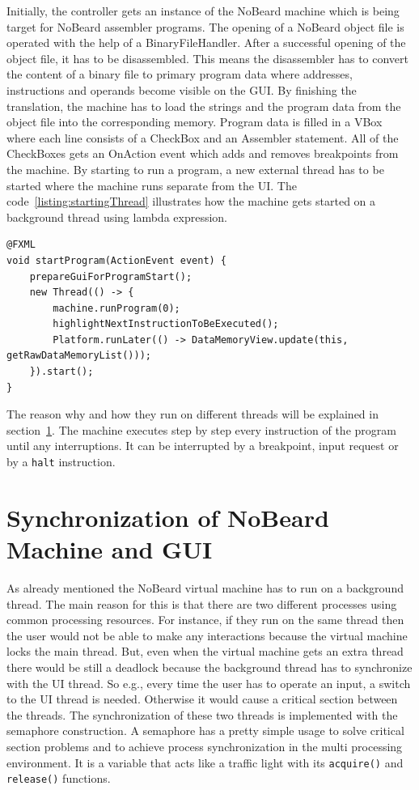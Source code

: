 Initially, the controller gets an instance of the NoBeard machine which is being target for NoBeard assembler programs. The opening of a NoBeard object file is operated with the help of a BinaryFileHandler. After a successful opening of the object file, it has to be disassembled. This means the disassembler has to convert the content of a binary file to primary program data where addresses, instructions and operands become visible on the GUI.
By finishing the translation, the machine has to load the strings and the program data from the object file into the corresponding memory. Program data is filled in a VBox where each line consists of a CheckBox and an Assembler statement. All of the CheckBoxes gets an OnAction event which adds and removes breakpoints from the machine. 
By starting to run a program, a new external thread has to be started where the machine runs separate from the UI. The code~\ref{listing:startingThread} illustrates how the machine gets started on a background thread using lambda expression.
\begin{lstlisting}[caption={Starting the machine on a new thread},label=listing:startingThread]
@FXML
void startProgram(ActionEvent event) {
    prepareGuiForProgramStart();
    new Thread(() -> {
        machine.runProgram(0);
        highlightNextInstructionToBeExecuted();
        Platform.runLater(() -> DataMemoryView.update(this, getRawDataMemoryList()));
    }).start();
}
\end{lstlisting}
The reason why and how they run on different threads will be explained in section~\ref{sec:synchronization}. The machine executes step by step every instruction of the program until any interruptions. It can be interrupted by a breakpoint, input request or by a \lstinline$halt$ instruction. 
\section{Synchronization of NoBeard Machine and GUI}
\label{sec:synchronization} 
As already mentioned the NoBeard virtual machine has to run on a background thread. The main reason for this is that there are two different processes using common processing resources. For instance, if they run on the same thread then the user would not be able to make any interactions because the virtual machine locks the main thread. But, even when the virtual machine gets an extra thread there would be still a deadlock because the background thread has to synchronize with the UI thread. So e.g., every time the user has to operate an input, a switch to the UI thread is needed. Otherwise it would cause a critical section between the threads. The synchronization of these two threads is implemented with the semaphore construction. A semaphore has a pretty simple usage to solve critical section problems and to achieve process synchronization in the multi processing environment. It is a variable that acts like a traffic light with its \lstinline$acquire()$ and \lstinline$release()$ functions.

